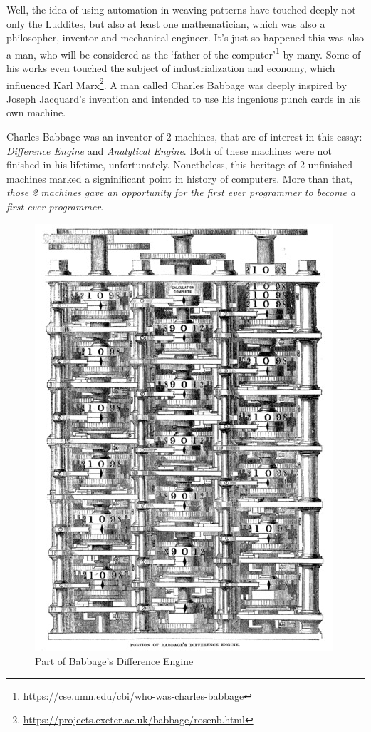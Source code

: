 \documentclass{report}
\begin{document}
            Well, the idea of using automation in weaving patterns have touched deeply not only the Luddites, but also at least one mathematician, which was also a philosopher,
            inventor and mechanical engineer. It's just so happened this was also a man, who will be considered as the `father of the computer'\footnote{\href{https://cse.umn.edu/cbi/who-was-charles-babbage}
            {https://cse.umn.edu/cbi/who-was-charles-babbage}} by many. Some of his works even touched the subject of industrialization and economy, which influenced Karl 
            Marx\footnote{\href{https://projects.exeter.ac.uk/babbage/rosenb.html}{https://projects.exeter.ac.uk/babbage/rosenb.html}}. A man called Charles Babbage was deeply
            inspired by Joseph Jacquard's invention and intended to use his ingenious punch cards in his own machine. \par

            Charles Babbage was an inventor of 2 machines, that are of interest in this essay: \emph{Difference Engine} and \emph{Analytical Engine}. Both of these machines
            were not finished in his lifetime, unfortunately. Nonetheless, this heritage of 2 unfinished machines marked a signinificant point in history of computers. More 
            than that, \emph{those 2 machines gave an opportunity for the first ever programmer to become a first ever programmer}. \par
            
            \begin{figure}
                \centering
                \includegraphics[scale=0.25]{images/devices/device_babbage_difference_engine.jpg}
                \caption{Part of Babbage's Difference Engine}
            \end{figure}
\end{document}
